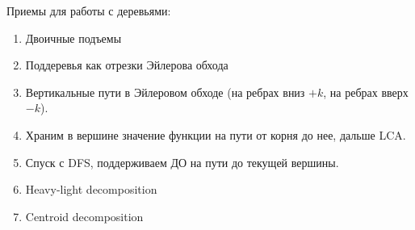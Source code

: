 Приемы для работы с деревьями:
\begin{enumerate}
	\item
	Двоичные подъемы

	\item
	Поддеревья как отрезки Эйлерова обхода
	
	\item
	Вертикальные пути в Эйлеровом обходе (на ребрах вниз $+k$, на ребрах вверх $-k$).
	
	\item
	Храним в вершине значение функции на пути от корня до нее, дальше LCA.
	
	\item
	Спуск с DFS, поддерживаем ДО на пути до текущей вершины.
	
	\item
	Heavy-light decomposition
	
	\item
	Centroid decomposition
\end{enumerate}
